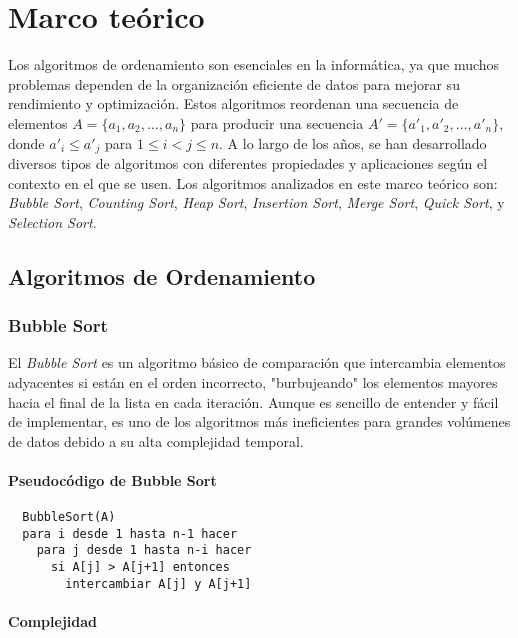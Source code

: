 \newpage
\section{Marco teórico}
Los algoritmos de ordenamiento son esenciales en la informática, ya que muchos problemas dependen de la organización eficiente de datos para mejorar su rendimiento y optimización. Estos algoritmos reordenan una secuencia de elementos \( A = \{a_1, a_2, \dots, a_n\} \) para producir una secuencia \( A' = \{a'_1, a'_2, \dots, a'_n\} \), donde \( a'_i \leq a'_j \) para \( 1 \leq i < j \leq n \). A lo largo de los años, se han desarrollado diversos tipos de algoritmos con diferentes propiedades y aplicaciones según el contexto en el que se usen. Los algoritmos analizados en este marco teórico son: \textit{Bubble Sort}, \textit{Counting Sort}, \textit{Heap Sort}, \textit{Insertion Sort}, \textit{Merge Sort}, \textit{Quick Sort}, y \textit{Selection Sort}.

\subsection{Algoritmos de Ordenamiento}

\subsubsection{Bubble Sort}

El \textit{Bubble Sort} es un algoritmo básico de comparación que intercambia elementos adyacentes si están en el orden incorrecto, "burbujeando" los elementos mayores hacia el final de la lista en cada iteración. Aunque es sencillo de entender y fácil de implementar, es uno de los algoritmos más ineficientes para grandes volúmenes de datos debido a su alta complejidad temporal.

\paragraph{Pseudocódigo de Bubble Sort}

\begin{verbatim}
  BubbleSort(A)
  para i desde 1 hasta n-1 hacer
    para j desde 1 hasta n-i hacer
      si A[j] > A[j+1] entonces
        intercambiar A[j] y A[j+1]
\end{verbatim}

\paragraph{Complejidad}

